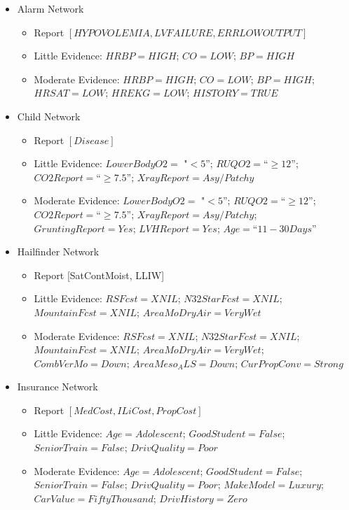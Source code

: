 \documentclass{article}
\begin{document}
\begin{itemize} 
    \item Alarm Network 
         \begin{itemize} 
            \item Report $[HYPOVOLEMIA, LVFAILURE, ERRLOWOUTPUT]$
            \item Little Evidence: $HRBP=HIGH$; $CO=LOW$; $BP=HIGH$
            \item Moderate Evidence: $HRBP=HIGH$; $CO=LOW$; $BP=HIGH$; $HRSAT=LOW$; $HREKG=LOW$; $HISTORY=TRUE$
         \end{itemize}
    \item Child Network 
        \begin{itemize} 
            \item Report $[Disease]$
            \item Little Evidence: $LowerBodyO2=$ "$<5$”; $RUQO2=$“$\geq12$”; $CO2Report=$“$\geq7.5$”; $XrayReport=Asy/Patchy$
            \item Moderate Evidence: $LowerBodyO2=$ "$<5$”; $RUQO2=$“$\geq12$”; $CO2Report=$“$\geq7.5$”; $XrayReport=Asy/Patchy$; $GruntingReport=Yes$; $LVHReport=Yes$; $Age=$“$11-30 Days$”
        \end{itemize}
    \item Hailfinder Network 
        \begin{itemize} 
            \item Report [SatContMoist, LLIW]
            \item Little Evidence: $RSFcst=XNIL$; $N32StarFcst=XNIL$; $MountainFcst=XNIL$; $AreaMoDryAir=VeryWet$
            \item Moderate Evidence: $RSFcst=XNIL$; $N32StarFcst=XNIL$; $MountainFcst=XNIL$; $AreaMoDryAir=VeryWet$; $CombVerMo=Down$; $AreaMeso_ALS=Down$; $CurPropConv=Strong$
        \end{itemize}
    \item Insurance Network 
        \begin{itemize} 
            \item Report $[MedCost, ILiCost, PropCost]$
            \item Little Evidence: $Age=Adolescent$; $GoodStudent=False$; $SeniorTrain=False$; $DrivQuality=Poor$
            \item Moderate Evidence: $Age=Adolescent$; $GoodStudent=False$; $SeniorTrain=False$; $DrivQuality=Poor$; $MakeModel=Luxury$; $CarValue=FiftyThousand$; $DrivHistory=Zero$
        \end{itemize}

\end{itemize}
\end{document}
